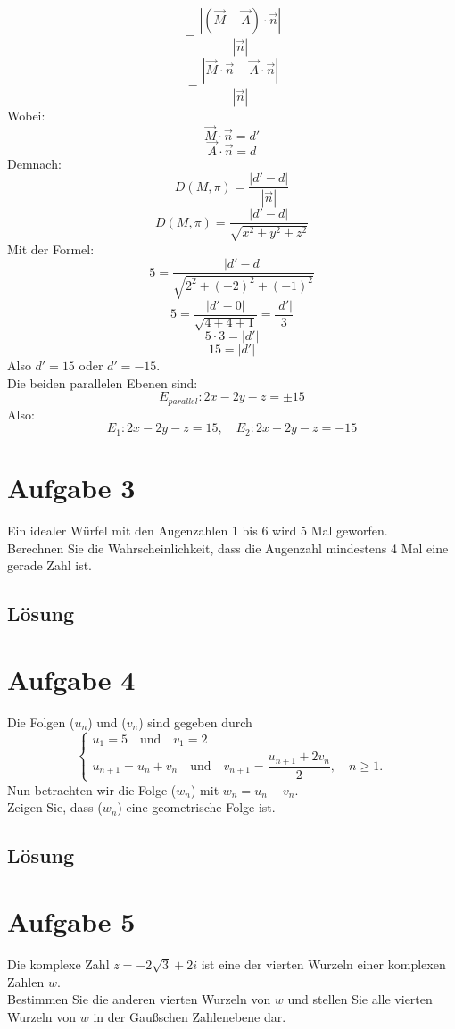 \documentclass{article}
\begin{document}
\[=\frac{\left|\left(\overrightarrow{M}-\overrightarrow{A}\right)\cdot \vec{n}\right|}{\left|\vec{n}\right|}\]
\[=\frac{\left|\overrightarrow{M}\cdot \vec{n}-\overrightarrow{A}\cdot \vec{n}\right|}{\left|\vec{n}\right|}\]
Wobei:
\[\overrightarrow{M}\cdot \vec{n}=d'\]
\[\overrightarrow{A}\cdot \vec{n}=d\]
Demnach:
\[D\left(M,\pi \right)=\frac{\left|d'-d\right|}{\left|\vec{n}\right|}\]
\[D\left(M,\pi \right)=\frac{\left|d'-d\right|}{\sqrt{x^2+y^2+z^2}}\]
Mit der Formel:
\[5=\frac{|d'-d|}{\sqrt{2^2+(-2)^2+(-1)^2}}\]
\[5=\frac{|d'-0|}{\sqrt{4+4+1}}=\frac{|d'|}{3}\]
\[5\cdot 3=|d'|\]
\[15=|d'|\]
Also \(d'=15\) oder \(d'=-15\). \\
Die beiden parallelen Ebenen sind:
\[E_{parallel}: 2x-2y-z=\pm 15\]
Also:
\[E_{1}: 2x-2y-z=15,\quad E_{2}: 2x-2y-z=-15\]

\newpage
\section*{Aufgabe 3}
Ein idealer Würfel mit den Augenzahlen 1 bis 6 wird 5 Mal geworfen. \\
Berechnen Sie die Wahrscheinlichkeit, dass die Augenzahl mindestens
4 Mal eine gerade Zahl ist.
\subsection*{Lösung}

\newpage
\section*{Aufgabe 4}
Die Folgen (\(u_n\)) und (\(v_n\)) sind gegeben durch
\[\begin{cases}
        u_1 = 5 \quad \text{und} \quad v_1 = 2 \\[2mm]
        u_{n+1} = u_n + v_n \quad \text{und} \quad v_{n+1} = \dfrac{u_{n+1} + 2v_n}{2}, \quad n \geq 1.
    \end{cases}\]
Nun betrachten wir die Folge (\(w_n\)) mit \(w_n=u_n-v_n\). \\
Zeigen Sie, dass (\(w_n\)) eine geometrische Folge ist.
\subsection*{Lösung}

\newpage
\section*{Aufgabe 5}
Die komplexe Zahl \(z=-2\sqrt{3}+2i\) ist eine der vierten Wurzeln einer
komplexen Zahlen \(w\). \\
Bestimmen Sie die anderen vierten Wurzeln von \(w\) und stellen Sie alle
vierten Wurzeln von \(w\) in der Gaußschen Zahlenebene dar.
\end{document}

